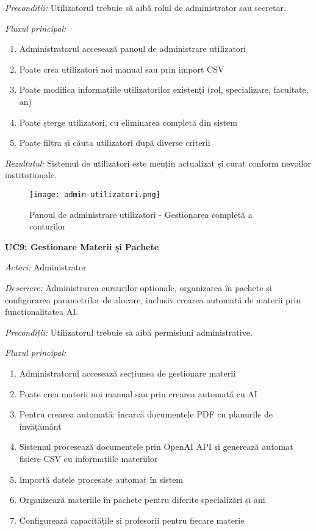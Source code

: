 \documentclass[12pt,a4paper]{report}
\begin{document}
\textit{Precondiții:} Utilizatorul trebuie să aibă rolul de administrator sau secretar.

\textit{Fluxul principal:}
\begin{enumerate}
\item Administratorul accesează panoul de administrare utilizatori
\item Poate crea utilizatori noi manual sau prin import CSV
\item Poate modifica informațiile utilizatorilor existenți (rol, specializare, facultate, an)
\item Poate șterge utilizatori, cu eliminarea completă din sistem
\item Poate filtra și căuta utilizatori după diverse criterii
\end{enumerate}

\textit{Rezultatul:} Sistemul de utilizatori este mențin actualizat și curat conform nevoilor instituționale.

\begin{figure}[H]
\centering
\texttt{[image: admin-utilizatori.png]}
\caption{Panoul de administrare utilizatori - Gestionarea completă a conturilor}
\label{fig:admin-utilizatori}
\end{figure}

\textbf{UC9: Gestionare Materii și Pachete}

\textit{Actori:} Administrator

\textit{Descriere:} Administrarea cursurilor opționale, organizarea în pachete și configurarea parametrilor de alocare, inclusiv crearea automată de materii prin funcționalitatea AI.

\textit{Precondiții:} Utilizatorul trebuie să aibă permisiuni administrative.

\textit{Fluxul principal:}
\begin{enumerate}
\item Administratorul accesează secțiunea de gestionare materii
\item Poate crea materii noi manual sau prin crearea automată cu AI
\item Pentru crearea automată: încarcă documentele PDF cu planurile de învățământ
\item Sistemul procesează documentele prin OpenAI API și generează automat fișiere CSV cu informațiile materiilor
\item Importă datele procesate automat în sistem
\item Organizează materiile în pachete pentru diferite specializări și ani
\item Configurează capacitățile și profesorii pentru fiecare materie
\end{enumerate}
\end{document}
